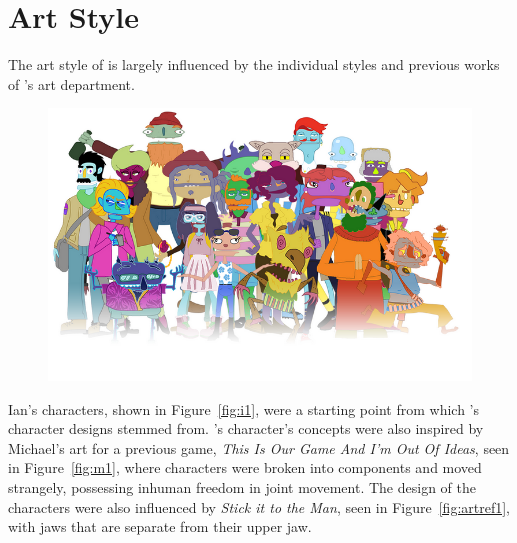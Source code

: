 \section{Art Style}
The art style of \ourgame{} is largely influenced by the individual styles and previous works of \ourteam{}'s art department.

\begin{figure}[H]
\centering\includegraphics[width=0.7\linewidth]{images/art_style}
\end{figure}

\clearpage
Ian's characters, shown in Figure~\ref{fig:i1}, were a starting point from which \ourgame{}'s character designs stemmed from. \ourgame{}'s character's concepts were also inspired by Michael's art for a previous game, \textit{This Is Our Game And I'm Out Of Ideas}, seen in Figure~\ref{fig:m1}, where characters were broken into components and moved strangely, possessing inhuman freedom in joint movement. The design of the characters were also influenced by \textit{Stick it to the Man}, seen in Figure~\ref{fig:artref1}, with jaws that are separate from their upper jaw.

